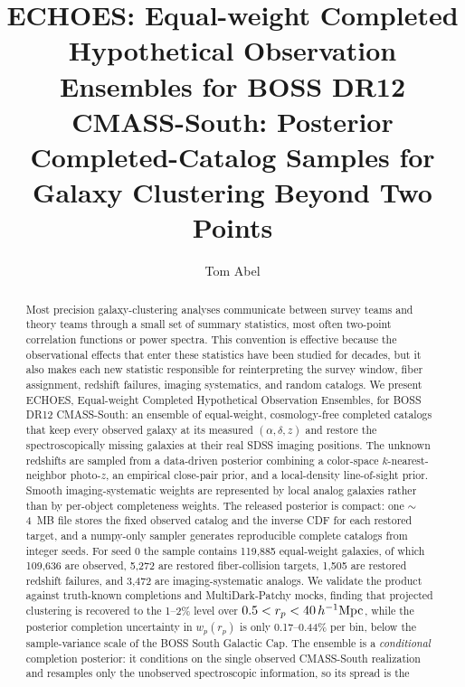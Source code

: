 \documentclass[apj]{emulateapj}
\providecommand{\correspondingauthor}[1]{}
\providecommand{\email}[1]{}
\begin{document}
\title{\textsc{ECHOES}: Equal-weight Completed Hypothetical Observation Ensembles
for BOSS DR12 CMASS-South:
Posterior Completed-Catalog Samples for Galaxy Clustering Beyond Two Points}

\author{Tom Abel}
\correspondingauthor{Tom Abel}
\email{tabel@stanford.edu}

\begin{abstract}
Most precision galaxy-clustering analyses communicate between survey teams and
theory teams through a small set of summary statistics, most often two-point
correlation functions or power spectra.  This convention is effective because the
observational effects that enter these statistics have been studied for decades,
but it also makes each new statistic responsible for reinterpreting the survey
window, fiber assignment, redshift failures, imaging systematics, and random
catalogs.  We present \textsc{ECHOES}, Equal-weight Completed Hypothetical
Observation Ensembles, for BOSS DR12 CMASS-South: an ensemble of equal-weight,
cosmology-free completed catalogs that keep every
observed galaxy at its measured $(\alpha,\delta,z)$ and restore the
spectroscopically missing galaxies at their real SDSS imaging positions.  The
unknown redshifts are sampled from a data-driven posterior combining a
color-space $k$-nearest-neighbor photo-$z$, an empirical close-pair prior, and a
local-density line-of-sight prior.  Smooth imaging-systematic weights are
represented by local analog galaxies rather than by per-object completeness
weights.  The released posterior is compact: one $\sim$4~MB file stores the fixed
observed catalog and the inverse CDF for each restored target, and a
numpy-only sampler generates reproducible complete catalogs from integer seeds.
For seed 0 the sample contains 119,885 equal-weight galaxies, of which 109,636
are observed, 5,272 are restored fiber-collision targets, 1,505 are restored
redshift failures, and 3,472 are imaging-systematic analogs.  We validate the
product against truth-known completions and MultiDark-Patchy mocks, finding
that projected clustering is recovered to the 1--2\% level over
$0.5<r_p<40\,h^{-1}{\rm Mpc}$, while the posterior completion uncertainty in
$w_p(r_p)$ is only 0.17--0.44\% per bin, below the sample-variance scale of the
BOSS South Galactic Cap.  The ensemble is a \emph{conditional} completion
posterior: it conditions on the single observed CMASS-South realization and
resamples only the unobserved spectroscopic information, so its spread is the

\end{abstract}
\end{document}
